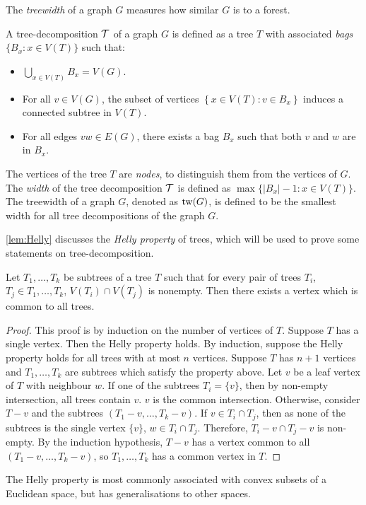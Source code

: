 The \textit{treewidth} of a graph \(G\) measures how similar $G$ is to a forest.
\begin{definition}\label{def:tree-decomposition}
	A tree-decomposition \(\mathcal{T}\) of a graph \(G\) is defined as a tree \(T\) with associated \textit{bags} \(\lbrace B_x : x \in V(T) \rbrace\) such that:
	\begin{itemize}
		\item $\bigcup_{x \in V(T)} B_x = V(G)$.
		\item For all \(v \in V(G)\), the subset of vertices \(\left\lbrace x \in V(T): v \in B_x \right\rbrace\) induces a connected subtree in \(V(T)\).
		\item For all edges \(vw \in E(G)\), there exists a bag \(B_x\) such that both \(v\) and \(w\) are in \(B_x\).
	\end{itemize}
\end{definition}
The vertices of the tree \(T\) are \textit{nodes}, to distinguish them from the vertices of $G$. 
The \textit{width} of the tree decomposition \(\mathcal{T}\) is defined as \(\max \lbrace |B_x| - 1 : x \in V(T) \rbrace\).
The treewidth of a graph \(G\), denoted as \(\operatorname{tw}(G)\), is defined to be the smallest width for all tree decompositions of the graph \(G\). 

\cref{lem:Helly} discusses the \textit{Helly property} of trees, which will be used to prove some statements on tree-decomposition. 

\begin{lemma}\label{lem:Helly}
	Let \(T_1, \ldots, T_k\) be subtrees of a tree \(T\) such that for every pair of trees $T_i$, $T_j \in T_1, \ldots, T_k$, $V(T_i) \cap V(T_j)$ is nonempty. Then there exists a vertex which is common to all trees.
\end{lemma}
\begin{proof}
	This proof is by induction on the number of vertices of $T$. Suppose $T$ has a single vertex. Then the Helly property holds. By induction, suppose the Helly property holds for all trees with at most $n$ vertices. Suppose $T$ has $n + 1$ vertices and \(T_1, \ldots, T_k\) are subtrees which satisfy the property above. Let $v$ be a leaf vertex of $T$ with neighbour $w$. If one of the subtrees $T_i = \{v\}$, then by non-empty intersection, all trees contain $v$. $v$ is the common intersection. Otherwise, consider $T - v$ and the subtrees $(T_1 - v, \ldots, T_k - v)$. If $v \in T_i \cap T_j$, then as none of the subtrees is the single vertex $\{v\}$, $w \in T_i \cap T_j$. Therefore, $T_i - v \cap T_j - v$ is non-empty. By the induction hypothesis, $T - v$ has a vertex common to all $(T_1 - v, \ldots, T_k - v)$, so \(T_1, \ldots, T_k\) has a common vertex in $T$. 
\end{proof}
The Helly property is most commonly associated with convex subsets of a Euclidean space, but has generalisations to other spaces. 

